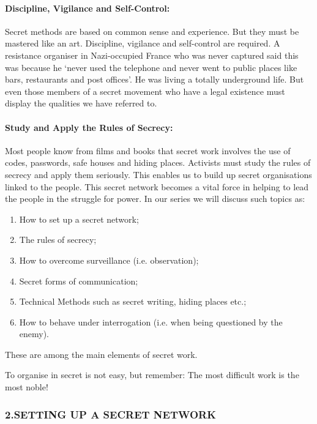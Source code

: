 \paragraph{Discipline, Vigilance and Self-Control:}

Secret methods are based on common sense and experience. But they must
be mastered like an art. Discipline, vigilance and self-control are
required. A resistance organiser in Nazi-occupied France who was never
captured said this was because he `never used the telephone and never
went to public places like bars, restaurants and post offices'. He was
living a totally underground life. But even those members of a secret
movement who have a legal existence must display the qualities we have
referred to.

\paragraph{Study and Apply the Rules of Secrecy:}

Most people know from films and books that secret work involves the use
of codes, passwords, safe houses and hiding places. Activists must study
the rules of secrecy and apply them seriously. This enables us to build
up secret organisations linked to the people. This secret network
becomes a vital force in helping to lead the people in the struggle for
power. In our series we will discuss such topics as:

\begin{enumerate}
\tightlist
\item
  How to set up a secret network;
\item
  The rules of secrecy;
\item
  How to overcome surveillance (i.e. observation);
\item
  Secret forms of communication;
\item
  Technical Methods such as secret writing, hiding places etc.;
\item
  How to behave under interrogation (i.e. when being questioned by the
  enemy).
\end{enumerate}

These are among the main elements of secret work.

To organise in secret is not easy, but remember: The most difficult work
is the most noble!

\subsubsection{2.SETTING UP A SECRET NETWORK}

